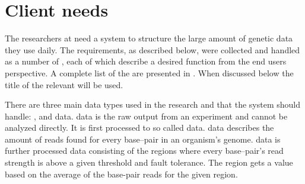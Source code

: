 


\section{Client needs}
The researchers at  need a system to structure the large amount of genetic data they use daily. The requirements, as described below, were collected and handled as a number of , each of which describe a desired function from the end users perspective. A complete list of the  are presented in . When discussed below the title of the relevant  will be used.

There are three main data types used in the research and that the system should handle: ,  and  data.  data is the raw output from an experiment and cannot be analyzed directly. It is first processed to so called  data.  data describes the amount of reads found for every base--pair in an organism's genome.  data is further processed  data consisting of the regions where every base--pair's read strength is above a given threshold and fault tolerance. The region gets a value based on the average of the base-pair reads for the given region.

